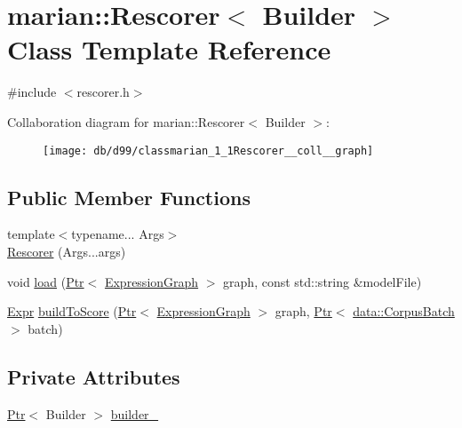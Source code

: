 \hypertarget{classmarian_1_1Rescorer}{}\section{marian\+:\+:Rescorer$<$ Builder $>$ Class Template Reference}
\label{classmarian_1_1Rescorer}


{\ttfamily \#include $<$rescorer.\+h$>$}



Collaboration diagram for marian\+:\+:Rescorer$<$ Builder $>$\+:
\nopagebreak
\begin{figure}[H]
\begin{center}
\leavevmode
\texttt{[image: db/d99/classmarian\_1\_1Rescorer\_\_coll\_\_graph]}
\end{center}
\end{figure}
\subsection*{Public Member Functions}
\begin{DoxyCompactItemize}
\item 
{\footnotesize template$<$typename... Args$>$ }\\\hyperlink{classmarian_1_1Rescorer_a67bca222ecff0e2fd09a0ee0664d7df8}{Rescorer} (Args...\+args)
\item 
void \hyperlink{classmarian_1_1Rescorer_aadfff7b573874b6936554c6e45931ac6}{load} (\hyperlink{namespacemarian_ad1a373be43a00ef9ce35666145137b08}{Ptr}$<$ \hyperlink{classmarian_1_1ExpressionGraph}{Expression\+Graph} $>$ graph, const std\+::string \&model\+File)
\item 
\hyperlink{namespacemarian_a498d8baf75b754011078b890b39c8e12}{Expr} \hyperlink{classmarian_1_1Rescorer_a82fac618c915e58ad2302e3cfe329d08}{build\+To\+Score} (\hyperlink{namespacemarian_ad1a373be43a00ef9ce35666145137b08}{Ptr}$<$ \hyperlink{classmarian_1_1ExpressionGraph}{Expression\+Graph} $>$ graph, \hyperlink{namespacemarian_ad1a373be43a00ef9ce35666145137b08}{Ptr}$<$ \hyperlink{classmarian_1_1data_1_1CorpusBatch}{data\+::\+Corpus\+Batch} $>$ batch)
\end{DoxyCompactItemize}
\subsection*{Private Attributes}
\begin{DoxyCompactItemize}
\item 
\hyperlink{namespacemarian_ad1a373be43a00ef9ce35666145137b08}{Ptr}$<$ Builder $>$ \hyperlink{classmarian_1_1Rescorer_ade8d099ced1d21c036c6aa38293ba5e9}{builder\+\_\+}
\end{DoxyCompactItemize}


